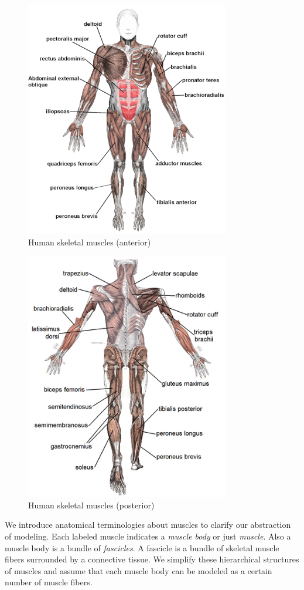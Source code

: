 \documentclass[master,english,final]{kaist-ucs}
\begin{document}
\begin{figure}[h!]
  \centering
  \includegraphics[width=3.5in]{muscles_anterior_labeled}
  \caption{Human skeletal muscles (anterior)}
  \label{skelmus1}
\end{figure}

\begin{figure}[h!]
  \centering
  \includegraphics[width=3.5in]{Muscle_posterior_labeled}
  \caption{Human skeletal muscles (posterior)}
  \label{skelmus2}
\end{figure}
\noindent

We introduce anatomical terminologies about muscles to clarify our abstraction of modeling.
Each labeled muscle indicates a \textit{muscle body} or just \textit{muscle}. Also a muscle body
is a bundle of \textit{fascicles}. A fascicle is a bundle of skeletal muscle fibers
surrounded by a connective tissue. We simplify these hierarchical structures of muscles and
assume that each muscle body can be modeled as a certain number of muscle fibers.
\end{document}
